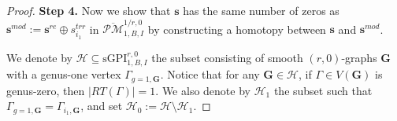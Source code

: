 \documentclass[11pt]{amsart}
\theoremstyle{definition}
\theoremstyle{remark}
\newcommand{\oPMb}{{\overline{\mathcal{PM}}}}
\newcommand{\nontilde}{}
\newcommand{\<}{\left<}
\renewcommand{\>}{\right>}
\numberwithin{equation}{section}
\def\sGPI{\text{sGPI}}
\begin{document}
\begin{proof}
         
        


        

        
        
    \noindent\textbf{Step 4.}
        Now we show that $\bm{s}$ has the same number of zeros as $\bm{s}^{mod}:=\bm{s}^{re} \oplus \nontilde{s}^{trr}_{i_1}$ in $\oPMb^{1/r,0}_{1,B,I}$ by constructing a homotopy between $\bm{s}$ and $\bm{s}^{mod}$. 

       
        
        
        We denote by $\bm{\mathcal H}\subseteq \sGPI^{r,0}_{1,B,I}$ the subset consisting of smooth $(r,0)$-graphs $\bm{G}$ with a genus-one vertex $\Gamma_{g=1,\mathbf{G}}$. 
        Notice that for any $\bm{G}\in \bm{\mathcal H}$, if $\Gamma\in V(\bm{G})$ is genus-zero, then $\lvert RT(\Gamma) \rvert=1$.
        We also denote by $\bm{\mathcal H}_1$ the subset such that $\Gamma_{g=1,\mathbf{G}}=\Gamma_{i_1,\mathbf{G}}$, and set $\bm{\mathcal H}_0:=\bm{\mathcal H}\setminus \bm{\mathcal H}_1$.


\end{proof}
\end{document}
